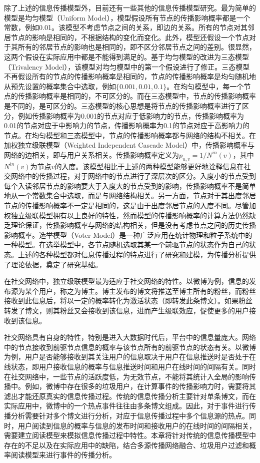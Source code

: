 除了上述的信息传播模型外，目前还有一些其他的信息传播模型研究。最为简单的模型是均匀模型（Uniform Model），模型假设所有节点的传播影响概率都是一个常数，例如0.01。该模型不考虑节点之间的关系，即边的关系。所有的节点对其邻居节点的影响是相同的，不根据结构的变化而变化。此外，模型还假设一个节点对于其所有的邻居节点的影响也是相同的，即不区分邻居节点之间的差别。很显然，这两个假设在实际应用中都是不能得到满足的。基于均匀模型的改进为三态模型（Trivalency Model），该模型对均匀模型中的第一个假设进行了修正。三态模型不再假设所有的节点的传播影响概率是相同的，节点的传播影响概率是均匀随机地从预先设置的概率集合中选取，例如$\{0.001,0.01,0.1\}$。在均匀模型中，每一个节点的传播影响概率是相同的，不可区分的。而在三态模型中，节点的传播影响概率是不同的，是可区分的。三态模型的核心思想是将节点的传播影响概率进行了区分，例如传播影响概率为0.001的节点对应于低影响力的节点，传播影响概率为0.01的节点对应于中影响力的节点，传播影响概率为0.1的节点对应于高影响力的节点。在均匀模型和三态模型中，节点的传播影响概率都与网络的结构不相关。在加权独立级联模型（Weighted Independent Cascade Model）中，传播影响概率与网络的边相关，即与用户关系相关。传播影响概率定义为$p_{u,v}=1 / N^{in}\left(v\right)$，其中$N^{in}\left(v\right)$为节点$v$的入度。该模型相比于上述的两种模型能够更好地诠释信息在社交网络中的传播过程，对于网络中的节点进行了深层次的区分。入度小的节点受到每个入读邻居节点的影响要大于入度大的节点受到的影响，传播影响概率不是简单地从一个常数集合中选取，而是与网络结构相关。另一方面，节点对于其出度邻居节点的传播影响概率不一定是相同的，这是由于出度邻居节点的入度不同。尽管加权独立级联模型拥有以上良好的特性，然而模型的传播影响概率的计算方法仍然缺乏理论保证，传播影响概率与网络的结构相关，但是没有考虑节点之间的历史传播影响概率。选举模型（Voter Model）是一种广泛应用在统计物理和粒子系统中的一种模型。在选举模型中，各节点随机选取其某一个前驱节点的状态作为自己的状态。上述的各种模型都对信息传播过程的特点进行了研究和建模，为传播分析提供了理论依据，奠定了研究基础。

在社交网络中，独立级联模型最为适应于社交网络的特性。以微博为例，信息的发布源为某个用户，称之为博主。博主发布的博文将推送至博主所有的粉丝，而粉丝接收到此信息后，将以一定的概率转化为激活状态（即转发此条博文）。如果粉丝转发了博文，则其粉丝又会接收到该信息，进而产生级联效应，促使更多的用户接收到该信息。

社交网络具有自身的特性，特别是进入大数据时代后，平台中的信息量庞大。网络中的节点接收到前驱节点信息的概率与该节点所有的前驱节点的状态有关。以微博为例，用户是否能够接收到其关注用户的信息取决于用户在信息推送时是否处于在线状态，即用户接收信息的概率与信息推送时间和用户在线时间的间隔有关。同时在社交网络中，一些节点的活跃度低，为无效节点，不能将其统计入全局的影响传播中。例如，微博中存在很多的垃圾用户，在计算事件的传播影响力时，需要将其滤出才能还原真实的信息传播过程。传统的信息传播分析主要针对单条博文，而在实际应用中，微博中的一个热点事件往往由多条博文组成。因此，对于事件进行传播分析需要针对多个博文进行分析，对应于信息传播过程中多个信息源的热点。同时，用户阅读到信息的概率与信息的发布时间和接收用户的在线时间的间隔相关，需要建立阅读模型来模拟信息传播过程中特性。本章将针对传统的信息传播模型中存在的不足以及在实际应用中的缺陷，结合多源传播网络融合、垃圾用户过滤和概率阅读模型来进行事件的传播分析。
